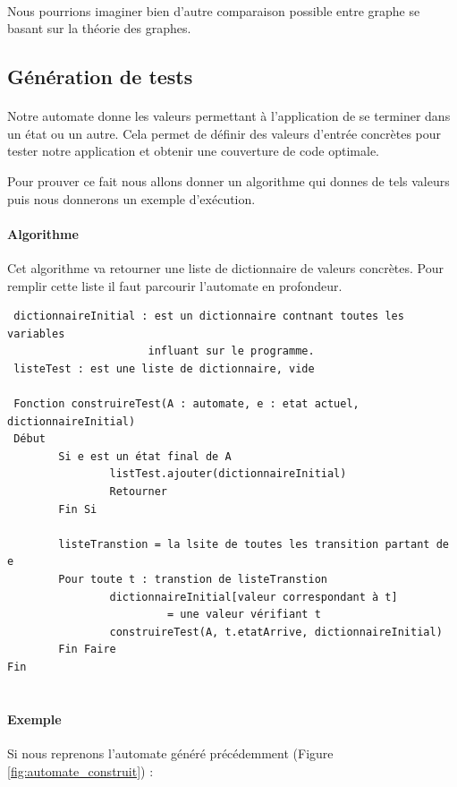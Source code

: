 \paragraph{}
Nous pourrions imaginer bien d'autre comparaison possible entre graphe se 
basant sur la théorie des graphes.

\subsection{Génération de tests}

\paragraph{}
Notre automate donne les valeurs permettant à l'application de se terminer 
dans un état ou un autre. Cela permet de définir des valeurs d'entrée concrètes 
pour tester notre application et obtenir une couverture de code optimale.


Pour prouver ce fait nous allons donner un algorithme qui donnes de tels 
valeurs puis nous donnerons un exemple d'exécution. 

\paragraph{Algorithme}
Cet algorithme va retourner une liste de dictionnaire de valeurs concrètes. 
Pour remplir cette liste il faut parcourir l'automate en profondeur.

\begin{verbatim}
 dictionnaireInitial : est un dictionnaire contnant toutes les variables
                      influant sur le programme.
 listeTest : est une liste de dictionnaire, vide
 
 Fonction construireTest(A : automate, e : etat actuel, dictionnaireInitial)
 Début
        Si e est un état final de A
                listTest.ajouter(dictionnaireInitial)
                Retourner
        Fin Si
        
        listeTranstion = la lsite de toutes les transition partant de e
        Pour toute t : transtion de listeTranstion
                dictionnaireInitial[valeur correspondant à t] 
                         = une valeur vérifiant t
                construireTest(A, t.etatArrive, dictionnaireInitial)
        Fin Faire
Fin
        
\end{verbatim}

\paragraph{Exemple}
Si nous reprenons l'automate généré précédemment (Figure 
\ref{fig:automate_construit}) :

